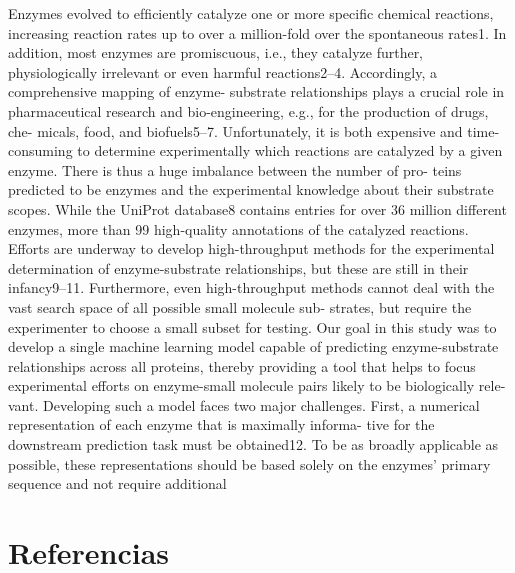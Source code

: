 \documentclass[12pt]{article}
\begin{document}
Enzymes evolved to efﬁciently catalyze one or more speciﬁc chemical reactions, increasing reaction rates up to over a million-fold over the spontaneous rates1. In addition, most enzymes are promiscuous, i.e.,
they catalyze further, physiologically irrelevant or even harmful
reactions2–4. Accordingly, a comprehensive mapping of enzyme-
substrate relationships plays a crucial role in pharmaceutical
research and bio-engineering, e.g., for the production of drugs, che-
micals, food, and biofuels5–7.
Unfortunately, it is both expensive and time-consuming to
determine experimentally which reactions are catalyzed by a given
enzyme. There is thus a huge imbalance between the number of pro-
teins predicted to be enzymes and the experimental knowledge about
their substrate scopes. While the UniProt database8 contains entries
for over 36 million different enzymes, more than 99%
high-quality annotations of the catalyzed reactions. Efforts are
underway to develop high-throughput methods for the experimental
determination of enzyme-substrate relationships, but these are still in
their infancy9–11. Furthermore, even high-throughput methods cannot
deal with the vast search space of all possible small molecule sub-
strates, but require the experimenter to choose a small subset for
testing.
Our goal in this study was to develop a single machine learning
model capable of predicting enzyme-substrate relationships across all
proteins, thereby providing a tool that helps to focus experimental
efforts on enzyme-small molecule pairs likely to be biologically rele-
vant. Developing such a model faces two major challenges. First, a
numerical representation of each enzyme that is maximally informa-
tive for the downstream prediction task must be obtained12. To be as
broadly applicable as possible, these representations should be based
solely on the enzymes’ primary sequence and not require additional


\section{Referencias}
\end{document}
